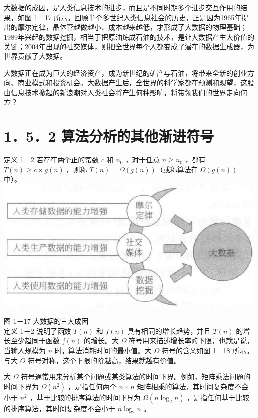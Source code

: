 \documentclass[10pt]{article}
\begin{document}
大数据的成因，是人类信息技术的进步，而且是不同时期多个进步交互作用的结果，如图 1－17 所示。回顾半个多世纪人类信息社会的历史，正是因为1965年提出的摩尔定律，晶体管越做越小、成本越来越低，才形成了大数据的物理基础；1989年兴起的数据挖掘，相当于把原油炼成石油的技术，是让大数据产生大价值的关键；2004年出现的社交媒体，则把全世界每个人都变成了潜在的数据生成器，为世界贡献了大数据。

大数据正在成为巨大的经济资产，成为新世纪的矿产与石油，将带来全新的创业方向、商业模式和投资机会。大数据产生后，全世界的科学家都在预测和观望，这股由信息技术掀起的新浪潮对人类社会将产生何种影响，将带领我们的世界走向何方？

\section*{1．5．2 算法分析的其他渐进符号}
定义 1－2 若存在两个正的常数 $c$ 和 $n_{0}$ ，对于任意 $n \geqslant n_{0}$ ，都有 $T(n) \geqslant c \times g(n)$ ，则称 $T(n)=\Omega(g(n))$（或称算法在 $\Omega(g(n))$ 中）。\\
\includegraphics[max width=\textwidth, center]{2025_06_06_704745ea57b15b2333e5g-036(2)}

图 1－17 大数据的三大成因\\
定义 1－2 说明了函数 $T(n)$ 和 $f(n)$ 具有相同的增长趋势，并且 $T(n)$ 的增长至少趋同于函数 $f(n)$ 的增长。大 $\Omega$ 符号用来描述增长率的下限，也就是说，当输人规模为 $n$ 时，算法消耗时间的最小值。大 $\Omega$ 符号的含义如图 1－18 所示。与大 $O$ 符号对称，这个下限的阶越高，结果就越有价值。

大 $\Omega$ 符号通常用来分析某个问题或某类算法的时间下界。例如，矩阵乘法问题的时间下界为 $\Omega\left(n^{2}\right)$ ，是指任何两个 $n \times n$ 矩阵相乘的算法，其时间复杂度不会小于 $n^{2}$ ，基于比较的排序算法的时间下界为 $\Omega\left(n \log _{2} n\right)$ ，是指任何基于比较的排序算法，其时间复杂度不会小于 $n \log _{2} n$ 。
\end{document}
